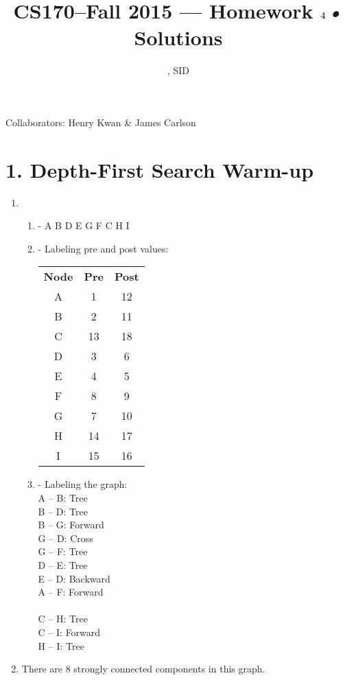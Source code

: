 \documentclass[11pt]{article}
\title{CS170--Fall 2015 --- Homework $4$\textsl{•} Solutions}
\author{\Name, SID \SID}
\date{}
\newenvironment{qparts}{\begin{enumerate}[{(}a{)}]}{\end{enumerate}}
\begin{document}
\maketitle

Collaborators: Henry Kwan \& James Carlson

\section*{1. Depth-First Search Warm-up}

\begin{qparts}
\item \begin{qparts}
	\item[-] A B D E G F C H I
	\item[-] Labeling pre and post values:

\begin{tabular}{ c c c }
 \textbf{Node} & \textbf{Pre} & \textbf{Post} \\ 
 A & 1 & 12 \\  
 B & 2 & 11 \\
 C & 13 & 18 \\
 D & 3 & 6 \\
 E & 4 & 5 \\
 F & 8 & 9 \\
 G & 7 & 10\\
 H & 14 & 17 \\
 I & 15 & 16 \\
\end{tabular}
	\item[-] Labeling the graph: \\
	A -- B: Tree \\
	B -- D: Tree \\
	B -- G: Forward \\
	G -- D: Cross\\
	G -- F: Tree\\
	D -- E: Tree\\
	E -- D: Backward\\
	A -- F: Forward\\
	\\
	C -- H: Tree\\
	C -- I: Forward\\
	H -- I: Tree\\
\end{qparts}
\item There are 8 strongly connected components in this graph.
\end{qparts}
\end{document}
